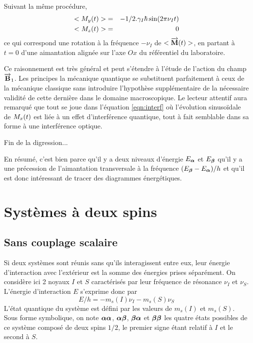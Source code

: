 Suivant la même procédure,
\begin{eqnarray}
<M_y(t)> & = & -1/2.\gamma_I\hbar\sin(2\pi\nu_It)\\
<M_z(t)> & = & 0
\end{eqnarray} 
ce qui correspond une rotation à la fréquence $-\nu_I$ de $<\overrightarrow{\mathbf{M}}(t)>$,
en partant à $t=0$ d'une aimantation alignée sur l'axe $Ox$
du référentiel du laboratoire.

Ce raisonnement est très général et peut s'étendre à l'étude de l'action
du champ $\overrightarrow{\mathbf{B}}_1$.
Les principes la mécanique quantique se substituent parfaitement
à ceux de la mécanique classique sans introduire l'hypothèse supplémentaire
de la nécessaire validité de cette dernière dans le domaine macroscopique.
Le lecteur attentif aura remarqué que tout se joue dans l'équation
\ref{eqn:interf} où l'évolution sinusoïdale de $M_x(t)$ est liée à un
effet d'interférence quantique, tout à fait semblable
dans sa forme à une interférence optique.

Fin de la digression...

En résumé, c'est bien parce qu'il y a deux niveaux d'énergie $E_{\boldsymbol{\alpha}}$
et $E_{\boldsymbol{\beta}}$ qu'il y a une précession de l'aimantation transversale à
la fréquence $(E_{\boldsymbol{\beta}} - E_{\boldsymbol{\alpha}})/h$ et qu'il est donc intéressant
de tracer des diagrammes énergétiques.

\section{Systèmes à deux spins}
\subsection{Sans couplage scalaire}
Si deux systèmes sont réunis sans qu'ils interagissent entre eux,
leur énergie d'interaction avec l'extérieur est la somme
des énergies prises séparément.
On considère ici 2 noyaux $I$ et $S$ caractérisés par leur fréquence
de résonance $\nu_I$ et $\nu_S$.
L'énergie d'interaction $E$ s'exprime donc par
\begin{equation}
E/h = -m_s(I)\nu_I -m_s(S)\nu_S
\end{equation}
L'état quantique du système est défini par les valeurs de $m_s(I)$ et $m_s(S)$.
Sous forme symbolique, on note $\boldsymbol{\alpha}\boldsymbol{\alpha}$, $\boldsymbol{\alpha}\boldsymbol{\beta}$, $\boldsymbol{\beta}\boldsymbol{\alpha}$ et $\boldsymbol{\beta}\boldsymbol{\beta}$
les quatre états possibles de ce système composé de deux spins $1/2$,
le premier signe étant relatif à $I$ et le second à $S$.

